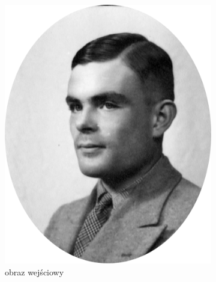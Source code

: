 \begin{figure}[H]
\begin{subfigure}{0.24\textwidth}
            \includegraphics[width = \textwidth]{img/6-comp/turing_original_c10_inv0.png}
            \caption{obraz wejściowy\\\hphantom{ }\\\hphantom{ }\\\hphantom{ }}
            \label{comp-comp-dali-turing-fawkes-e}
        \end{subfigure}
        \begin{subfigure}{0.24\textwidth}
            \centering

\end{subfigure}
\end{figure}
